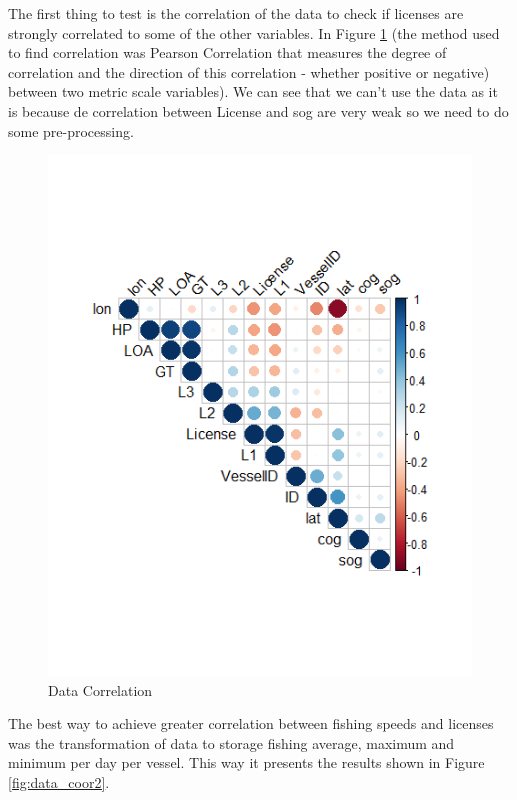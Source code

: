 The first thing to test is the correlation of the data to check if licenses are strongly correlated to some of the other variables. In Figure \ref{fig:data_coor1} (the method used to find correlation was Pearson Correlation \cite{Benesty2009} that measures the degree of correlation and the direction of this correlation - whether positive or negative) between two metric scale variables). We can see that we can’t use the data as it is because de correlation between License and sog are very weak so we need to do some pre-processing.
\begin{figure}[H]
    \centering
    \includegraphics[width=0.8\linewidth]{Chapters/img/data_coor1.png}
    \caption{Data Correlation}
    \label{fig:data_coor1}
\end{figure}


The best way to achieve greater correlation between fishing speeds and licenses was the transformation of data to storage fishing average, maximum and minimum per day per vessel. This way it presents the results shown in Figure \ref{fig:data_coor2}.

